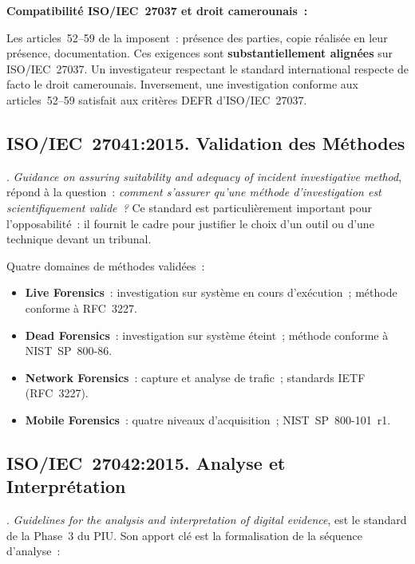 \begin{boxjuris}
\textbf{Compatibilité ISO/IEC~27037 et droit camerounais~:}

Les articles~52--59 de la  imposent~: présence des parties,
copie réalisée en leur présence, documentation. Ces exigences sont
\textbf{substantiellement alignées} sur ISO/IEC~27037. Un investigateur
respectant le standard international respecte de facto le droit camerounais.
Inversement, une investigation conforme aux articles~52--59 satisfait
aux critères DEFR d'ISO/IEC~27037.
\end{boxjuris}

\subsection{ISO/IEC~27041:2015. Validation des Méthodes}

. \textit{Guidance on assuring suitability and
adequacy of incident investigative method}, répond à la question~:
\emph{comment s'assurer qu'une méthode d'investigation est scientifiquement
valide~?} Ce standard est particulièrement important pour l'opposabilité~:
il fournit le cadre pour justifier le choix d'un outil ou d'une technique
devant un tribunal.

Quatre domaines de méthodes validées~:
\begin{itemize}
    \item \textbf{Live Forensics}~: investigation sur système en cours
          d'exécution~; méthode conforme à RFC~3227.
    \item \textbf{Dead Forensics}~: investigation sur système éteint~;
          méthode conforme à NIST~SP~800-86.
    \item \textbf{Network Forensics}~: capture et analyse de trafic~;
          standards IETF (RFC~3227).
    \item \textbf{Mobile Forensics}~: quatre niveaux d'acquisition~;
          NIST~SP~800-101~\cite{nist800101r1}r1.
\end{itemize}

\subsection{ISO/IEC~27042:2015. Analyse et Interprétation}

. \textit{Guidelines for the analysis and
interpretation of digital evidence}, est le standard de la Phase~3 du PIU.
Son apport clé est la formalisation de la séquence d'analyse~:

